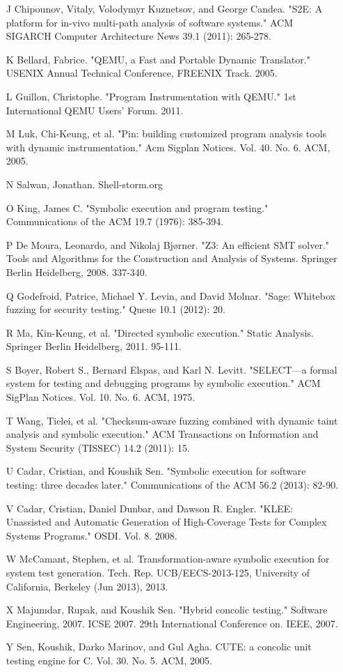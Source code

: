 \documentclass[10pt, twocolumn, times, nocopyrightspace, preprint]{sigplanconf}
\begin{document}
\begin{itemize}
	\item [J] Chipounov, Vitaly, Volodymyr Kuznetsov, and George Candea. "S2E: A platform for in-vivo multi-path analysis of software systems." ACM SIGARCH Computer Architecture News 39.1 (2011): 265-278.
	\item [K] Bellard, Fabrice. "QEMU, a Fast and Portable Dynamic Translator." USENIX Annual Technical Conference, FREENIX Track. 2005.
	\item [L] Guillon, Christophe. "Program Instrumentation with QEMU." 1st International QEMU Users’ Forum. 2011.
	\item [M] Luk, Chi-Keung, et al. "Pin: building customized program analysis tools with dynamic instrumentation." Acm Sigplan Notices. Vol. 40. No. 6. ACM, 2005.
	\item [N] Salwan, Jonathan. Shell-storm.org %
	\item [O] King, James C. "Symbolic execution and program testing." Communications of the ACM 19.7 (1976): 385-394.
	\item [P] De Moura, Leonardo, and Nikolaj Bjørner. "Z3: An efficient SMT solver." Tools and Algorithms for the Construction and Analysis of Systems. Springer Berlin Heidelberg, 2008. 337-340.
	\item [Q] Godefroid, Patrice, Michael Y. Levin, and David Molnar. "Sage: Whitebox fuzzing for security testing." Queue 10.1 (2012): 20.
	\item [R] Ma, Kin-Keung, et al. "Directed symbolic execution." Static Analysis. Springer Berlin Heidelberg, 2011. 95-111.
	\item [S] Boyer, Robert S., Bernard Elspas, and Karl N. Levitt. "SELECT—a formal system for testing and debugging programs by symbolic execution." ACM SigPlan Notices. Vol. 10. No. 6. ACM, 1975.
	\item [T] Wang, Tielei, et al. "Checksum-aware fuzzing combined with dynamic taint analysis and symbolic execution." ACM Transactions on Information and System Security (TISSEC) 14.2 (2011): 15.
	\item [U] Cadar, Cristian, and Koushik Sen. "Symbolic execution for software testing: three decades later." Communications of the ACM 56.2 (2013): 82-90.
	\item [V] Cadar, Cristian, Daniel Dunbar, and Dawson R. Engler. "KLEE: Unassisted and Automatic Generation of High-Coverage Tests for Complex Systems Programs." OSDI. Vol. 8. 2008.
	\item [W] McCamant, Stephen, et al. Transformation-aware symbolic execution for system test generation. Tech. Rep. UCB/EECS-2013-125, University of California, Berkeley (Jun 2013), 2013.
	\item [X] Majumdar, Rupak, and Koushik Sen. "Hybrid concolic testing." Software Engineering, 2007. ICSE 2007. 29th International Conference on. IEEE, 2007.
	\item [Y] Sen, Koushik, Darko Marinov, and Gul Agha. CUTE: a concolic unit testing engine for C. Vol. 30. No. 5. ACM, 2005.

\end{itemize}
\end{document}

